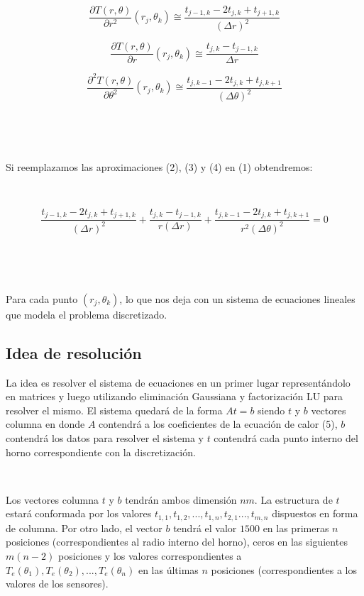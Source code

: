 ~

\begin{equation}
 \frac{\partial T(r,\theta)}{\partial r^2}(r_j,\theta_k) \cong 
 \frac{t_{j-1,k}-2t_{j,k}+t_{j+1,k}}{(\Delta r)^2}
\end{equation}

\begin{equation}
 \frac{\partial T(r,\theta)}{\partial r}(r_j,\theta_k) \cong
 \frac{t_{j,k}-t_{j-1,k}}{\Delta r} 
\end{equation}

\begin{equation}
 \frac{\partial^2T(r,\theta)}{\partial\theta^2}(r_j,\theta_k) \cong
 \frac{t_{j,k-1}-2t_{j,k}+t_{j,k+1}}{(\Delta \theta)^2}
\end{equation}

~

~

Si reemplazamos las aproximaciones (2), (3) y (4) en (1) obtendremos:

~

\begin{equation}
 \frac{t_{j-1,k}-2t_{j,k}+t_{j+1,k}}{(\Delta r)^2} 
 + \frac{t_{j,k}-t_{j-1,k}}{r(\Delta r)} 
 + \frac{t_{j,k-1}-2t_{j,k}+t_{j,k+1}}{r^2(\Delta \theta)^2}
 = 0
\end{equation}

~

~

Para cada punto $(r_j,\theta_k)$, lo que nos deja con un sistema de ecuaciones lineales que modela el problema discretizado.

\newpage
\subsection{Idea de resoluci\'on}

La idea es resolver el sistema de ecuaciones en un primer lugar represent\'andolo en matrices y luego utilizando eliminaci\'on Gaussiana y factorizaci\'on LU para resolver el mismo. El sistema quedar\'a de la forma $At = b$ siendo $t$ y $b$ vectores columna  en donde $A$ contendr\'a a los coeficientes de la ecuaci\'on de calor (5), $b$ contendr\'a los datos para resolver el sistema y $t$ contendr\'a cada punto interno del horno correspondiente con la discretizaci\'on.

~

Los vectores columna $t$ y $b$ tendr\'an ambos dimensi\'on $nm$. La estructura de $t$ estar\'a conformada por los valores $t_{1,1}, t_{1,2}, ..., t_{1,n}, t_{2,1} ..., t_{m,n}$ dispuestos en forma de columna. Por otro lado, el vector $b$ tendr\'a el valor $1500$ en las primeras $n$ posiciones (correspondientes al radio interno del horno), ceros en las siguientes $m(n-2)$ posiciones y los valores correspondientes a $T_e(\theta_1), T_e(\theta_2), ..., T_e(\theta_n)$ en las \'ultimas $n$ posiciones (correspondientes a los valores de los sensores).

